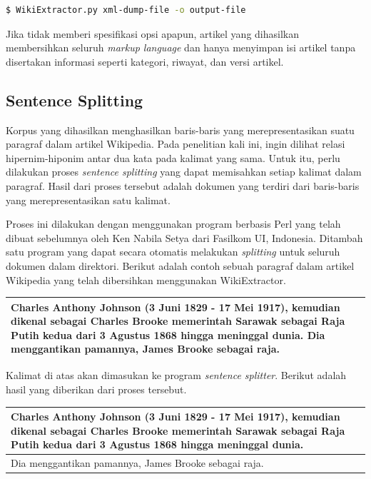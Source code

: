 \begin{lstlisting}[caption={Penggunaan Wiki Extractor}, language=bash]
$ WikiExtractor.py xml-dump-file -o output-file
\end{lstlisting}

\noindent Jika tidak memberi spesifikasi opsi apapun, artikel yang dihasilkan membersihkan seluruh \textit{markup language} dan hanya menyimpan isi artikel tanpa disertakan informasi seperti kategori, riwayat, dan versi artikel.

\subsection{Sentence Splitting}
Korpus yang dihasilkan menghasilkan baris-baris yang merepresentasikan suatu paragraf dalam artikel Wikipedia. Pada penelitian kali ini, ingin dilihat relasi hipernim-hiponim antar dua kata pada kalimat yang sama. Untuk itu, perlu dilakukan proses \textit{sentence splitting} yang dapat memisahkan setiap kalimat dalam paragraf. Hasil dari proses tersebut adalah dokumen yang terdiri dari baris-baris yang merepresentasikan satu kalimat. 

Proses ini dilakukan dengan menggunakan program berbasis Perl yang telah dibuat sebelumnya oleh Ken Nabila Setya dari Fasilkom UI, Indonesia. Ditambah satu program yang dapat secara otomatis melakukan \textit{splitting} untuk seluruh dokumen dalam direktori. Berikut adalah contoh sebuah paragraf dalam artikel Wikipedia yang telah dibersihkan menggunakan WikiExtractor.

\begin{center}
\begin{tabular}{ | m{32em} | } 
\hline
Charles Anthony Johnson (3 Juni 1829 - 17 Mei 1917), kemudian dikenal sebagai Charles Brooke memerintah Sarawak sebagai Raja Putih kedua dari 3 Agustus 1868 hingga meninggal dunia. Dia menggantikan pamannya, James Brooke sebagai raja. \\ \hline 
\end{tabular}
\end{center}

\noindent Kalimat di atas akan dimasukan ke program \textit{sentence splitter}. Berikut adalah hasil yang diberikan dari proses tersebut.

\begin{center}
\begin{tabular}{ | m{32em} | } 
\hline
Charles Anthony Johnson (3 Juni 1829 - 17 Mei 1917), kemudian dikenal sebagai Charles Brooke memerintah Sarawak sebagai Raja Putih kedua dari 3 Agustus 1868 hingga meninggal dunia. \\ \hline 
Dia menggantikan pamannya, James Brooke sebagai raja. \\
\hline
\end{tabular}
\end{center}

